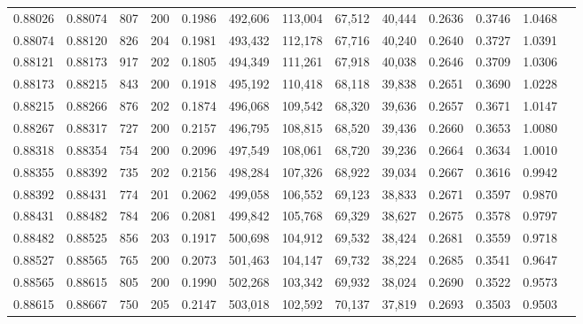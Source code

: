 \begin{tabular}{rrrrrrrrrrrrr}
0.88026 & 0.88074 &   807 & 200 &                                     0.1986 & 492,606 & 113,004 &  67,512 &  40,444 & 0.2636 & 0.3746 & 1.0468 \\
0.88074 & 0.88120 &   826 & 204 &                                     0.1981 & 493,432 & 112,178 &  67,716 &  40,240 & 0.2640 & 0.3727 & 1.0391 \\
0.88121 & 0.88173 &   917 & 202 &                                     0.1805 & 494,349 & 111,261 &  67,918 &  40,038 & 0.2646 & 0.3709 & 1.0306 \\
0.88173 & 0.88215 &   843 & 200 &                                     0.1918 & 495,192 & 110,418 &  68,118 &  39,838 & 0.2651 & 0.3690 & 1.0228 \\
0.88215 & 0.88266 &   876 & 202 &                                     0.1874 & 496,068 & 109,542 &  68,320 &  39,636 & 0.2657 & 0.3671 & 1.0147 \\
0.88267 & 0.88317 &   727 & 200 &                                     0.2157 & 496,795 & 108,815 &  68,520 &  39,436 & 0.2660 & 0.3653 & 1.0080 \\
0.88318 & 0.88354 &   754 & 200 &                                     0.2096 & 497,549 & 108,061 &  68,720 &  39,236 & 0.2664 & 0.3634 & 1.0010 \\
0.88355 & 0.88392 &   735 & 202 &                                     0.2156 & 498,284 & 107,326 &  68,922 &  39,034 & 0.2667 & 0.3616 & 0.9942 \\
0.88392 & 0.88431 &   774 & 201 &                                     0.2062 & 499,058 & 106,552 &  69,123 &  38,833 & 0.2671 & 0.3597 & 0.9870 \\
0.88431 & 0.88482 &   784 & 206 &                                     0.2081 & 499,842 & 105,768 &  69,329 &  38,627 & 0.2675 & 0.3578 & 0.9797 \\
0.88482 & 0.88525 &   856 & 203 &                                     0.1917 & 500,698 & 104,912 &  69,532 &  38,424 & 0.2681 & 0.3559 & 0.9718 \\
0.88527 & 0.88565 &   765 & 200 &                                     0.2073 & 501,463 & 104,147 &  69,732 &  38,224 & 0.2685 & 0.3541 & 0.9647 \\
0.88565 & 0.88615 &   805 & 200 &                                     0.1990 & 502,268 & 103,342 &  69,932 &  38,024 & 0.2690 & 0.3522 & 0.9573 \\
0.88615 & 0.88667 &   750 & 205 &                                     0.2147 & 503,018 & 102,592 &  70,137 &  37,819 & 0.2693 & 0.3503 & 0.9503 \\

\end{tabular}
